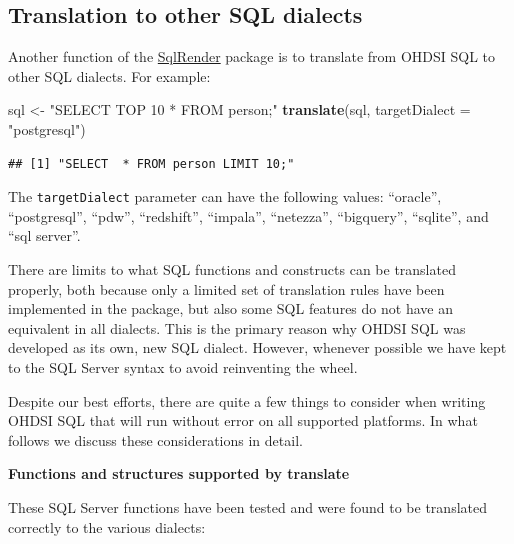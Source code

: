 \documentclass[11pt]{book}
\newenvironment{Shaded}{\begin{snugshade}}{\end{snugshade}}
\newcommand{\DataTypeTok}[1]{\textcolor[rgb]{0.13,0.29,0.53}{#1}}
\newcommand{\KeywordTok}[1]{\textcolor[rgb]{0.13,0.29,0.53}{\textbf{#1}}}
\newcommand{\NormalTok}[1]{#1}
\newcommand{\StringTok}[1]{\textcolor[rgb]{0.31,0.60,0.02}{#1}}
\theoremstyle{definition}
\theoremstyle{definition}
\theoremstyle{definition}
\theoremstyle{remark}
\let\BeginKnitrBlock\begin \let\EndKnitrBlock\end
\begin{document}
\hypertarget{translation-to-other-sql-dialects}{%
\subsection{Translation to other SQL dialects}\label{translation-to-other-sql-dialects}}

Another function of the \href{https://ohdsi.github.io/SqlRender/}{SqlRender} package is to translate from OHDSI SQL to other SQL dialects. For example:

\begin{Shaded}
\begin{Highlighting}[]
\NormalTok{sql <-}\StringTok{ "SELECT TOP 10 * FROM person;"}
\KeywordTok{translate}\NormalTok{(sql, }\DataTypeTok{targetDialect =} \StringTok{"postgresql"}\NormalTok{)}
\end{Highlighting}
\end{Shaded}

\begin{verbatim}
## [1] "SELECT  * FROM person LIMIT 10;"
\end{verbatim}

The \texttt{targetDialect} parameter can have the following values: ``oracle'', ``postgresql'', ``pdw'', ``redshift'', ``impala'', ``netezza'', ``bigquery'', ``sqlite'', and ``sql server''. 

\BeginKnitrBlock{rmdimportant}
There are limits to what SQL functions and constructs can be translated properly, both because only a limited set of translation rules have been implemented in the package, but also some SQL features do not have an equivalent in all dialects. This is the primary reason why OHDSI SQL was developed as its own, new SQL dialect. However, whenever possible we have kept to the SQL Server syntax to avoid reinventing the wheel.
\EndKnitrBlock{rmdimportant}

Despite our best efforts, there are quite a few things to consider when writing OHDSI SQL that will run without error on all supported platforms. In what follows we discuss these considerations in detail.

\textbf{Functions and structures supported by translate}

These SQL Server functions have been tested and were found to be translated correctly to the various dialects:
\end{document}
